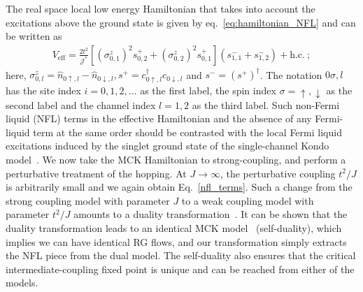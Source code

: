 \documentclass[reprint,prb,superscriptaddress]{revtex4-2}
\begin{document}
The real space local low energy Hamiltonian that takes into account the excitations above the ground state is given by eq.~\ref{eq:hamiltonian_NFL} and can be written as
\begin{equation}\begin{aligned}
	\label{nfl_terms}
	V_\text{eff} = \frac{2t^2}{{\mathcal{J}^*}}\left[\left(\sigma^z_{0,1}\right)^2 s^+_{0,2} + \left(\sigma^z_{0,2}\right)^2 s^+_{0,1}\right] \left(s^-_{1,1} + s^-_{1,2}\right) + \text{h.c.}~;
\end{aligned}\end{equation}
here, \(\sigma^z_{0,l} = \hat n_{0\uparrow,l} - \hat n_{0\downarrow,l}, s^+ = c^\dagger_{0 \uparrow,l}c_{0 \downarrow,l}\) and \(s^- = \left(s^+\right)^\dagger\). The notation \(0\sigma,l\) has the site index \(i=0,1,2,\ldots\) as the first label, the spin index \(\sigma=\uparrow,\downarrow\) as the second label and the channel index \(l=1,2\) as the third label.
Such non-Fermi liquid (NFL) terms in the effective Hamiltonian and the absence of any Fermi-liquid term at the same order should be contrasted with the local Fermi liquid excitations induced by the singlet ground state of the single-channel Kondo model~\cite{nozieres1974fermi,wilson1975renormalization,hewson1993}.
We now take the MCK Hamiltonian to strong-coupling, and perform a perturbative treatment of the hopping.
At \(J \to \infty\), the perturbative coupling \(t^2/J\) is arbitrarily small and we again obtain Eq.~\ref{nfl_terms}. Such a change from the strong coupling model with parameter \(J\) to a weak coupling model with parameter \(t^2/J\) amounts to a duality transformation~\cite{kroha_kolf_2007,zitko_fabrizio_2017}.
It can be shown that the duality transformation leads to an identical MCK model~\cite{kroha_kolf_2007} (self-duality), which implies we can have identical RG flows, and our transformation simply extracts the NFL piece from the dual model.
The self-duality also ensures that the critical intermediate-coupling fixed point is unique and can be reached from either of the models.
\end{document}
